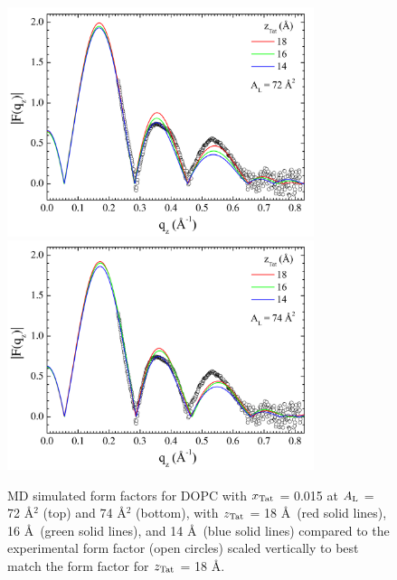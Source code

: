 \begin{figure}[htbp]
  \centering
  \includegraphics[width=0.8\textwidth]{figures/Tat/MD_Results/xff/dopc-tat2_72_sim-exp1}
  \includegraphics[width=0.8\textwidth]{figures/Tat/MD_Results/xff/dopc-tat2_74_sim-exp1}
  \caption{MD simulated form factors for DOPC with $x_\textrm{Tat}$ = 0.015 
  at $A_\textrm{L}$ = 72 \AA$^2$ (top) and 74 \AA$^2$ (bottom),
  with $z_\textrm{Tat}$ = 18 \AA\ (red solid lines), 16 \AA\ (green solid lines), 
  and 14 \AA\ (blue solid lines) compared to the experimental form factor 
  (open circles) scaled vertically to best match the form factor for 
  $z_\textrm{Tat}$ = 18 \AA.}
  \label{fig:MD_dopc-tat2_sim-exp}
\end{figure}

